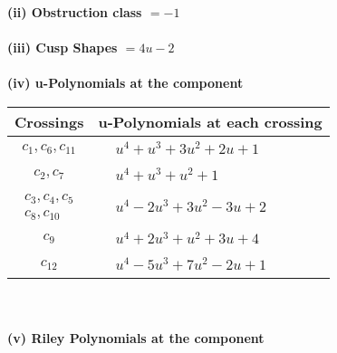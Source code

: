 \documentclass[1p]{elsarticle_modified}
\theoremstyle{definition}
\begin{document}
\flushleft \textbf{(ii) Obstruction class $= -1$}\\~\\
\flushleft \textbf{(iii) Cusp Shapes $= 4 u-2$}\\~\\
\newpage\renewcommand{\arraystretch}{1}
\flushleft \textbf{(iv) u-Polynomials at the component}\newline \\
\begin{tabular}{m{50pt}|m{274pt}}
Crossings & \hspace{64pt}u-Polynomials at each crossing \\
\hline $$\begin{aligned}c_{1},c_{6},c_{11}\end{aligned}$$&$\begin{aligned}
&u^4+u^3+3 u^2+2 u+1
\end{aligned}$\\
\hline $$\begin{aligned}c_{2},c_{7}\end{aligned}$$&$\begin{aligned}
&u^4+u^3+u^2+1
\end{aligned}$\\
\hline $$\begin{aligned}c_{3},c_{4},c_{5}\\c_{8},c_{10}\end{aligned}$$&$\begin{aligned}
&u^4-2 u^3+3 u^2-3 u+2
\end{aligned}$\\
\hline $$\begin{aligned}c_{9}\end{aligned}$$&$\begin{aligned}
&u^4+2 u^3+u^2+3 u+4
\end{aligned}$\\
\hline $$\begin{aligned}c_{12}\end{aligned}$$&$\begin{aligned}
&u^4-5 u^3+7 u^2-2 u+1
\end{aligned}$\\
\hline
\end{tabular}\\~\\
\newpage\renewcommand{\arraystretch}{1}
\flushleft \textbf{(v) Riley Polynomials at the component}\newline \\
\end{document}

